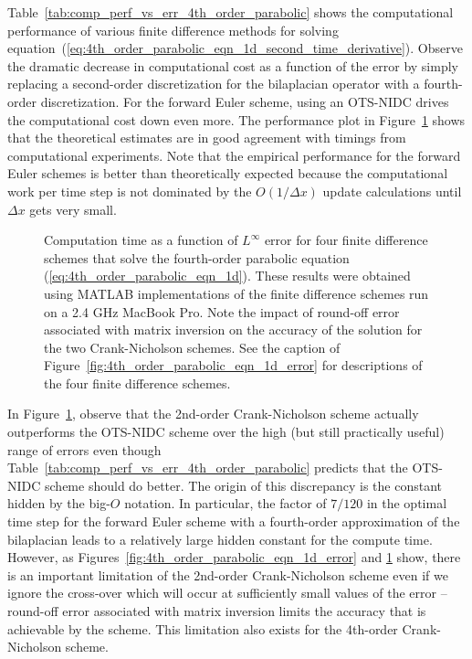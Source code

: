 \documentclass[fleqn,12pt,twoside]{article}
\def\dx{\Delta x}
\begin{document}
Table~\ref{tab:comp_perf_vs_err_4th_order_parabolic} shows the computational 
performance of various finite difference methods for solving 
equation~(\ref{eq:4th_order_parabolic_eqn_1d_second_time_derivative}).
Observe the dramatic decrease in computational cost as a function of the
error by simply replacing a second-order discretization for the bilaplacian 
operator with a fourth-order discretization.  For the forward Euler scheme,
using an OTS-NIDC drives the computational cost down even more.
The performance plot in Figure~\ref{fig:4th_order_parabolic_eqn_1d_perf} 
shows that the theoretical estimates are in good agreement with timings 
from computational experiments.  Note that the empirical performance for the 
forward Euler schemes is better than theoretically expected because the 
computational work per time step is not dominated by the 
$O(1/\dx)$ update calculations until $\dx$ gets very small.

\begin{figure}[tb]
\begin{center}
\caption{Computation time as a function of $L^\infty$ error for four
finite difference schemes that solve the fourth-order parabolic equation
(\ref{eq:4th_order_parabolic_eqn_1d}).  
These results were obtained using MATLAB implementations of the 
finite difference schemes run on a 2.4 GHz MacBook Pro.
Note the impact of round-off error associated with matrix inversion on 
the accuracy of the solution for the two Crank-Nicholson schemes.
See the caption of Figure~\ref{fig:4th_order_parabolic_eqn_1d_error} for 
descriptions of the four finite difference schemes.
}
\label{fig:4th_order_parabolic_eqn_1d_perf}
\end{center}
\end{figure}

In Figure~\ref{fig:4th_order_parabolic_eqn_1d_perf}, observe that the 
2nd-order Crank-Nicholson scheme actually outperforms the OTS-NIDC scheme over 
the high (but still practically useful) range of errors even though 
Table~\ref{tab:comp_perf_vs_err_4th_order_parabolic} predicts that the OTS-NIDC
scheme should do better.  The origin of this discrepancy is the constant 
hidden by the big-$O$ notation.  In particular, the factor of $7/120$ in 
the optimal time step for the forward Euler scheme with a fourth-order 
approximation of the bilaplacian leads to a relatively large hidden constant 
for the compute time. 
However, as Figures~\ref{fig:4th_order_parabolic_eqn_1d_error} and
\ref{fig:4th_order_parabolic_eqn_1d_perf} show, there is an important 
limitation of the 2nd-order Crank-Nicholson scheme even if we ignore the 
cross-over which will occur at sufficiently small values of the error -- 
round-off error associated with matrix inversion limits the accuracy that is 
achievable by the scheme.  This limitation also exists for the 4th-order 
Crank-Nicholson scheme. 
\end{document}
